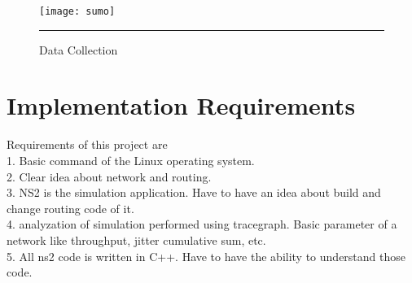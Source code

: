 \begin{figure}[htbp]
	\centering
	\texttt{[image: sumo]}
	\rule{35em}{0.5pt}
	\caption[Data Collection]{Data Collection}
	\label{Data Collection}
\end{figure}

\pagebreak
\section{Implementation Requirements}
Requirements of this project are \\
1. Basic command of the Linux operating system.\\
2. Clear idea about network and routing.\\
3. NS2 is the simulation application. Have to have an idea about build and change routing code of it.\\
4. analyzation of simulation performed using tracegraph. Basic parameter of a network like throughput, jitter cumulative sum, etc.\\
5. All ns2 code is written in C++. Have to have the ability to understand those code.